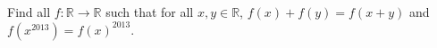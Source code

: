 Find all $f:\mathbb{R}\to\mathbb{R}$ such that for all $x,y\in\mathbb{R}$, $f(x)+f(y) = f(x+y)$ and $f(x^{2013}) = f(x)^{2013}$.

